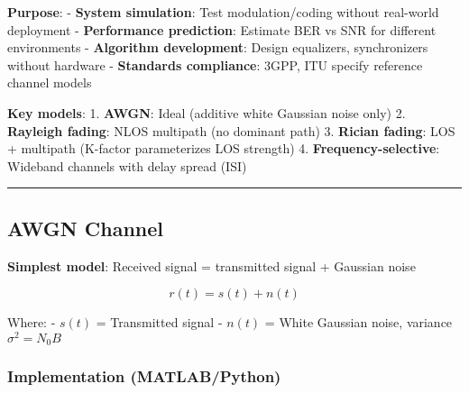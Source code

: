 \textbf{Purpose}: - \textbf{System simulation}: Test modulation/coding
without real-world deployment - \textbf{Performance prediction}:
Estimate BER vs SNR for different environments - \textbf{Algorithm
development}: Design equalizers, synchronizers without hardware -
\textbf{Standards compliance}: 3GPP, ITU specify reference channel
models

\textbf{Key models}: 1. \textbf{AWGN}: Ideal (additive white Gaussian
noise only) 2. \textbf{Rayleigh fading}: NLOS multipath (no dominant
path) 3. \textbf{Rician fading}: LOS + multipath (K-factor parameterizes
LOS strength) 4. \textbf{Frequency-selective}: Wideband channels with
delay spread (ISI)

\begin{center}\rule{0.5\linewidth}{0.5pt}\end{center}

\subsection{AWGN Channel}\label{awgn-channel}

\textbf{Simplest model}: Received signal = transmitted signal + Gaussian
noise

\[
r(t) = s(t) + n(t)
\]

Where: - \(s(t)\) = Transmitted signal - \(n(t)\) = White Gaussian
noise, variance \(\sigma^2 = N_0 B\)

\subsubsection{Implementation
(MATLAB/Python)}\label{implementation-matlabpython}

